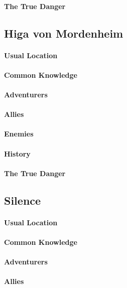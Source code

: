 \begin{multicols}{2}
    \paragraph{The True Danger}

\subsection{Higa von Mordenheim}
    \paragraph{Usual Location}
    \paragraph{Common Knowledge} 
    \paragraph{Adventurers}
    \paragraph{Allies}
    \paragraph{Enemies}
    \paragraph{History}
    \paragraph{The True Danger}

\subsection{Silence} 
    \paragraph{Usual Location}
    \paragraph{Common Knowledge} 
    \paragraph{Adventurers}
    \paragraph{Allies}

\end{multicols}
